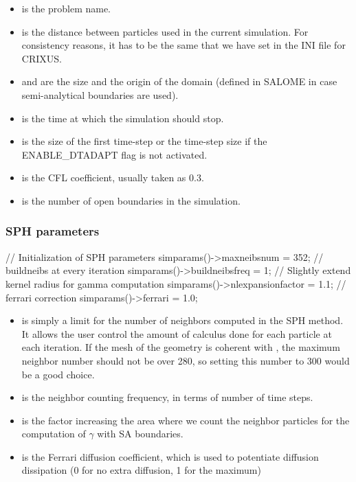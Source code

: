 \begin{itemize}
\item {} is the problem name.

\item {} is the distance between particles used in the current simulation. 
For consistency reasons, it has to be the same that we have set in the INI file for CRIXUS.

\item {} and  are the size and the origin of the domain 
(defined in SALOME in case semi-analytical boundaries are used).

\item {} is the time at which the simulation should stop.

\item {} is the size of the first time-step or the time-step size if the ENABLE\_DTADAPT
flag is not activated.

\item {} is the CFL coefficient, usually taken as 0.3.

\item {} is the number of open boundaries in the simulation.
\end{itemize}

\subsubsection{SPH parameters}
\begin{ccode}
// Initialization of SPH parameters
simparams()->maxneibsnum = 352;
// buildneibs at every iteration
simparams()->buildneibsfreq = 1;
// Slightly extend kernel radius for gamma computation
simparams()->nlexpansionfactor = 1.1;
// ferrari correction
simparams()->ferrari = 1.0;
\end{ccode}
\begin{itemize}
\item {} is simply a limit for the number of neighbors computed 
in the SPH method. It allows the user control the amount of calculus 
done for each particle at each iteration. If the mesh of the geometry 
is coherent with , the maximum neighbor number should not be over 280, 
so setting this number to 300 would be a good choice.
\item {} is the neighbor counting frequency, 
in terms of number of time steps.
\item {} is the factor increasing the area 
where we count the neighbor particles
for the computation of $\gamma$ with SA boundaries.
\item {} is the Ferrari diffusion coefficient, which is used 
to potentiate diffusion dissipation (0 for no extra diffusion, 1 for the maximum)
\end{itemize}

